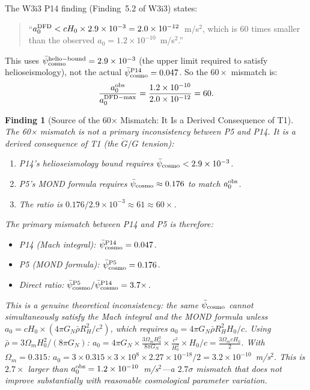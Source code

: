 \documentclass[11pt]{article}
\newtheorem{finding}{Finding}
\newcommand{\ee}[1]{\times 10^{#1}}
\newcommand{\psicosmo}{\bar{\psi}_{\rm cosmo}}
\begin{document}
The W3i3 P14 finding (Finding~5.2 of W3i3) states:
\begin{quote}
``$a_0^{\rm DFD} < c H_0 \times 2.9\ee{-3} = 2.0\ee{-12}$~m/s$^2$,
which is 60 times smaller than the observed $a_0 = 1.2\ee{-10}$~m/s$^2$.''
\end{quote}
This uses $\psicosmo^{\rm helio-bound} = 2.9\ee{-3}$ (the upper limit required
to satisfy helioseismology), not the actual $\psicosmo^{\rm P14} = 0.047$.
So the $60\times$ mismatch is:
\begin{equation}
\frac{a_0^{\rm obs}}{a_0^{\rm DFD-max}} = \frac{1.2\ee{-10}}{2.0\ee{-12}} = 60.
\label{eq:60x-correct}
\end{equation}

\begin{finding}[Source of the 60× Mismatch: It Is a Derived Consequence of T1]
\label{find:60x}
The 60× mismatch is \emph{not} a primary inconsistency between P5 and P14.
It is a \emph{derived consequence} of T1 (the $\dot{G}/G$ tension):
\begin{enumerate}
\item P14's helioseismology bound requires $\psicosmo < 2.9\ee{-3}$.
\item P5's MOND formula requires $\psicosmo \approx 0.176$ to match $a_0^{\rm obs}$.
\item The ratio is $0.176/2.9\ee{-3} \approx 61 \approx 60\times$.
\end{enumerate}
The primary mismatch between P14 and P5 is therefore:
\begin{itemize}
\item P14 (Mach integral): $\psicosmo^{\rm P14} = 0.047$.
\item P5 (MOND formula): $\psicosmo^{\rm P5} = 0.176$.
\item Direct ratio: $\psicosmo^{\rm P5}/\psicosmo^{\rm P14} = 3.7\times$.
\end{itemize}
This is a genuine theoretical inconsistency: the same $\psicosmo$ cannot
simultaneously satisfy the Mach integral and the MOND formula unless
$a_0 = c H_0 \times (4\pi G_N \bar{\rho} R_H^2/c^2)$, which requires
$a_0 = 4\pi G_N \bar{\rho} R_H^2 H_0 / c$.
Using $\bar{\rho} = 3\Omega_m H_0^2/(8\pi G_N)$:
$a_0 = 4\pi G_N \times \frac{3\Omega_m H_0^2}{8\pi G_N} \times \frac{c^2}{H_0^2} \times H_0 / c
= \frac{3\Omega_m c H_0}{2}$.
With $\Omega_m = 0.315$: $a_0 = 3\times0.315\times3\ee{8}\times2.27\ee{-18}/2
= 3.2\ee{-10}$~m/s$^2$.
This is $2.7\times$ larger than $a_0^{\rm obs} = 1.2\ee{-10}$~m/s$^2$---a
$2.7\sigma$ mismatch that does not improve substantially with reasonable
cosmological parameter variation.
\end{finding}
\end{document}
